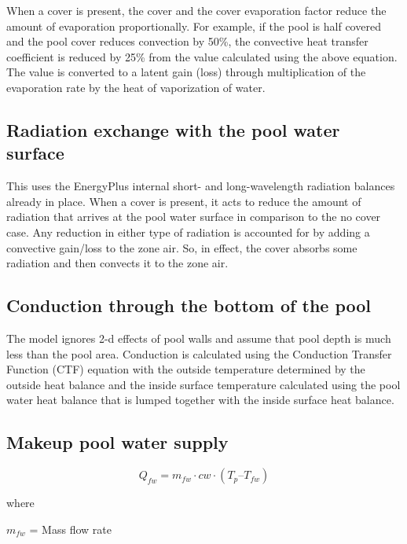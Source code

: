 When a cover is present, the cover and the cover evaporation factor reduce the amount of evaporation proportionally. For example, if the pool is half covered and the pool cover reduces convection by 50\%, the convective heat transfer coefficient is reduced by 25\% from the value calculated using the above equation. The value is converted to a latent gain (loss) through multiplication of the evaporation rate by the heat of vaporization of water.

\subsection{Radiation exchange with the pool water surface}\label{radiation-exchange-with-the-pool-water-surface}

This uses the EnergyPlus internal short- and long-wavelength radiation balances already in place. When a cover is present, it acts to reduce the amount of radiation that arrives at the pool water surface in comparison to the no cover case. Any reduction in either type of radiation is accounted for by adding a convective gain/loss to the zone air. So, in effect, the cover absorbs some radiation and then convects it to the zone air.

\subsection{Conduction through the bottom of the pool}\label{conduction-through-the-bottom-of-the-pool}

The model ignores 2-d effects of pool walls and assume that pool depth is much less than the pool area. Conduction is calculated using the Conduction Transfer Function (CTF) equation with the outside temperature determined by the outside heat balance and the inside surface temperature calculated using the pool water heat balance that is lumped together with the inside surface heat balance.

\subsection{Makeup pool water supply}\label{makeup-pool-water-supply}

\begin{equation}
Q_{fw} = m_{fw} \cdot cw \cdot (T_p – T_{fw})
\end{equation}

where

\(m_{fw}\) = Mass flow rate

